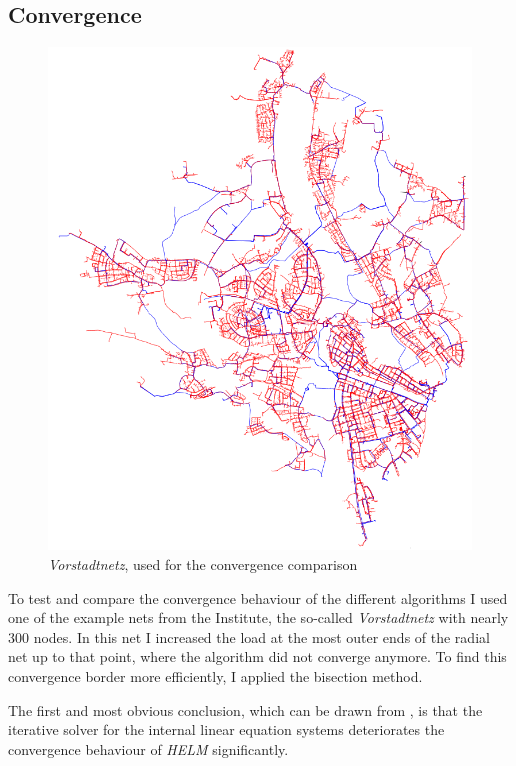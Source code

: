 \subsection{Convergence}

\begin{figure}
	\centering
	\includegraphics[width=\textwidth]{figures/vorstadtnetz}
	\caption[\emph{Vorstadtnetz}]{\emph{Vorstadtnetz}, used for the convergence comparison}
	\label{fig:vorstadtnetz}
\end{figure}

To test and compare the convergence behaviour of the different algorithms I used one of the example nets from the Institute, the so-called \emph{Vorstadtnetz}  with nearly 300 nodes. In this net I increased the load at the most outer ends of the radial net up to that point, where the algorithm did not converge anymore. To find this convergence border more efficiently, I applied the bisection method.

The first and most obvious conclusion, which can be drawn from , is that the iterative solver for the internal linear equation systems deteriorates the convergence behaviour of \emph{HELM} significantly. 

